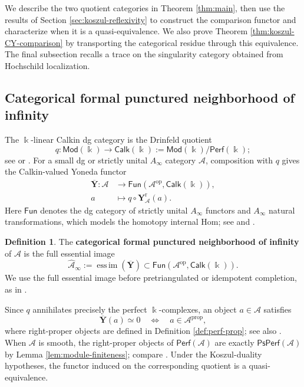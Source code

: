 \documentclass[11pt,letterpaper,reqno]{amsart}
\theoremstyle{plain}
\theoremstyle{definition}
\newtheorem{definition}[definition]{Definition}
\theoremstyle{plain}
\theoremstyle{definition}
\numberwithin{equation}{section}
\begin{document}
We describe the two quotient categories in Theorem \ref{thm:main}, then use the results of Section \ref{sec:koszul-reflexivity} to construct the comparison functor and characterize when it is a quasi-equivalence.
We also prove Theorem \ref{thm:koszul-CY-comparison} by transporting the categorical residue through this equivalence.
The final subsection recalls a trace on the singularity category obtained from Hochschild localization.

\subsection{Categorical formal punctured neighborhood of infinity}\label{subsec:formal-punctured-neighborhood}

The $\Bbbk$-linear Calkin dg category is the Drinfeld quotient
\[
q:\mathsf{Mod}(\Bbbk)\longrightarrow\mathsf{Calk}(\Bbbk)
:=\mathsf{Mod}(\Bbbk)/\mathsf{Perf}(\Bbbk);
\]
see \cite[Proposition 1.1]{Efimov2017} or \cite[Section 2.2]{Ganatra-Gao-Venkatesh2022}.
For a small dg or strictly unital $A_\infty$ category $\mathscr A$, composition with $q$ gives the Calkin-valued Yoneda functor
\begin{equation}\label{eq:reduced-Yoneda}
\begin{aligned}
\overline{\mathbf Y}:\mathscr A
&\longrightarrow\mathsf{Fun}(\mathscr A^{\mathrm{op}},\mathsf{Calk}(\Bbbk)),\\
a&\longmapsto q\circ\mathbf Y_{\mathscr A}^{\mathrm r}(a).
\end{aligned}
\end{equation}
Here $\mathsf{Fun}$ denotes the dg category of strictly unital $A_\infty$ functors and $A_\infty$ natural transformations, which models the homotopy internal Hom; see \cite[Section 1 and Proposition 3.6]{Efimov2017} and \cite[Sections 2.1 and 2.3]{Ganatra-Gao-Venkatesh2022}.

\begin{definition}\label{def:cat-form-punc-nbhd}
The \textbf{categorical formal punctured neighborhood of infinity} of $\mathscr A$ is the full essential image
\[
\widehat{\mathscr A}_{\infty}
:=\operatorname{ess\,im}(\overline{\mathbf Y})
\subset\mathsf{Fun}(\mathscr A^{\mathrm{op}},\mathsf{Calk}(\Bbbk)).
\]
We use the full essential image before pretriangulated or idempotent completion, as in \cite[Definition 3.3(3)]{Efimov2017}.
\end{definition}

Since $q$ annihilates precisely the perfect $\Bbbk$-complexes, an object $a\in\mathscr A$ satisfies
\[
\overline{\mathbf Y}(a)\simeq0
\quad\Longleftrightarrow\quad
a\in\mathscr A^{\mathrm{prop}},
\]
where right-proper objects are defined in Definition \ref{def:perf-prop}; see also \cite[Lemma 2.8]{Ganatra-Gao-Venkatesh2022}.
When $\mathscr A$ is smooth, the right-proper objects of $\mathsf{Perf}(\mathscr A)$ are exactly $\mathsf{PsPerf}(\mathscr A)$ by Lemma \ref{lem:module-finiteness}; compare \cite[Proposition 4.1]{Efimov2017}.
Under the Koszul-duality hypotheses, the functor induced on the corresponding quotient is a quasi-equivalence.
\end{document}
